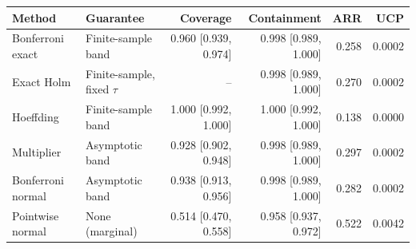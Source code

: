 \begin{tabular}{llrrrr}
\toprule
Method & Guarantee & Coverage & Containment & ARR & UCP \\
\midrule
Bonferroni exact & Finite-sample band & 0.960 [0.939, 0.974] & 0.998 [0.989, 1.000] & 0.258 & 0.0002 \\
Exact Holm & Finite-sample, fixed $\tau$ & -- & 0.998 [0.989, 1.000] & 0.270 & 0.0002 \\
Hoeffding & Finite-sample band & 1.000 [0.992, 1.000] & 1.000 [0.992, 1.000] & 0.138 & 0.0000 \\
Multiplier & Asymptotic band & 0.928 [0.902, 0.948] & 0.998 [0.989, 1.000] & 0.297 & 0.0002 \\
Bonferroni normal & Asymptotic band & 0.938 [0.913, 0.956] & 0.998 [0.989, 1.000] & 0.282 & 0.0002 \\
Pointwise normal & None (marginal) & 0.514 [0.470, 0.558] & 0.958 [0.937, 0.972] & 0.522 & 0.0042 \\
\bottomrule
\end{tabular}
